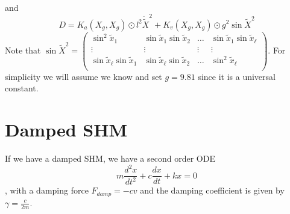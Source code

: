 \documentclass{article}
\begin{document}
and 
$$
D = K_a(X_g, X_g) \odot l^2\dot{\tilde{X}}^2 + K_v(X_g, X_g) \odot g^2\sin\tilde{X}^2
$$
Note that $\sin\tilde{X}^2=\begin{pmatrix}
  \sin^2\tilde{x}_1 & \sin\tilde{x}_1\sin\tilde{x}_2 & \dots & \sin\tilde{x}_1\sin\tilde{x}_{\ell} \\
  \vdots & \vdots & \vdots & \vdots \\
  \sin\tilde{x}_{\ell}\sin\tilde{x}_1 & \sin\tilde{x}_{\ell}\sin\tilde{x}_2 & \dots & \sin^2\tilde{x}_{\ell} \\
\end{pmatrix}.$ 
For simplicity we will assume we know and set $g=9.81$ since it is a universal constant.


\section*{Damped SHM}
If we have a damped SHM, we have a second order ODE 
$$
m\frac{d^2x}{dt^2}+c\frac{dx}{dt}+kx=0
$$, with a damping force $F_{damp}=-cv$ and the damping coefficient is given by $\gamma=\frac{c}{2m}$.
\end{document}
